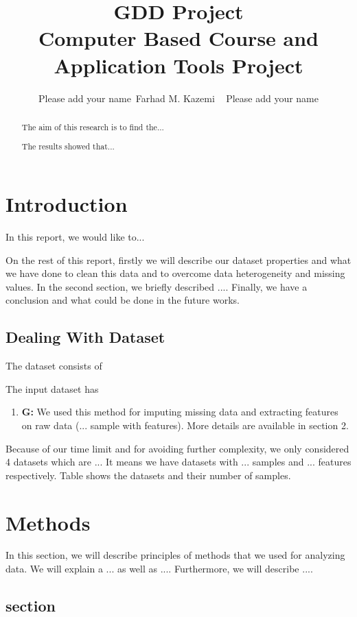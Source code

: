 \documentclass[12pt,letterpaper]{article}
\begin{document}
\title{GDD Project \\ \vspace{.5 cm} {\Large Computer Based Course and Application Tools Project} }
\author{Please add your name~Farhad M. Kazemi ~ Please add your name}
\maketitle
\begin{abstract}
The aim of this research is to find the...

The results showed that...
\end{abstract}

\section{Introduction}

In this report, we would like to...

On the rest of this report, firstly we will describe our dataset properties and what we have done to clean this data and to overcome data heterogeneity and missing values. In the second section, we briefly described ....
Finally, we have a conclusion and what could be done in the future works.
\subsection{Dealing With Dataset}
The dataset consists of 

The input dataset has 
\begin{enumerate}
\item \textbf{G:} We used this method for imputing missing data and extracting features on raw data (... sample with features). More details are available in section 2.
\end{enumerate}
\noindent Because of our time limit and for avoiding further complexity, we only considered 4 datasets which are ... 
It means we have datasets with ... samples and ... features respectively. Table shows the datasets and their number of samples.
\section{Methods}
In this section, we will describe principles of methods that we used for analyzing data. We will explain a ... as well as ....  Furthermore, we will describe .... 
\subsection{ section}
\end{document}
